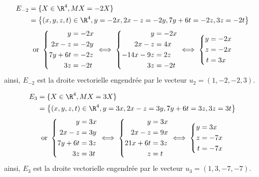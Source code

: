 {\begin{enumerate}
{\begin{align*}
E_{-2}&=\{X\in\R^4,MX=-2X\} \\ &=\left\{(x,y,z,t)\in \R^4,y=-2x,2x-z=-2y,7y+6t=-2z,3z=-2t\right\} 
\end{align*}
$${\hbox{or}}\ \left\{\begin{align*}y&=-2x \\  2x-z&=-2y \\  7y+6t&=-2z \\  3z&=-2t\end{align*}\right.\iff
\left\{\begin{align*}y&=-2x \\  2x-z&=4x \\  -14x-9z&=2z \\  3z&=-2t\end{align*}\right.\iff
\left\{\begin{align*}y&=-2x \\  z&=-2x \\  t&=3x\end{align*}\right.$$
ainsi, $E_{-2}$ est la droite vectorielle engendr\'ee par le vecteur $u_2=(1,-2,-2,3)$.

\begin{align*}
E_3&=\{X\in\R^4,MX=3X\} \\  &=\left\{(x,y,z,t)\in \R^4,y=3x,2x-z=3y,7y+6t=3z,3z=3t\right\}
\end{align*}
$${\hbox{or}}\ \left\{\begin{align*}y&=3x \\  2x-z&=3y \\  7y+6t&=3z \\  3z&=3t\end{align*}\right.\iff
\left\{\begin{align*}y&=3x \\  2x-z&=9x \\  21x+6t&=3z \\  z&=t\end{align*}\right.\iff
\left\{\begin{align*}y&=3x \\  z&=-7x \\  t&=-7x\end{align*}\right.$$
ainsi, $E_3$ est la droite vectorielle engendr\'ee par le vecteur $u_3=(1,3,-7,-7)$.

}
\end{enumerate}}
